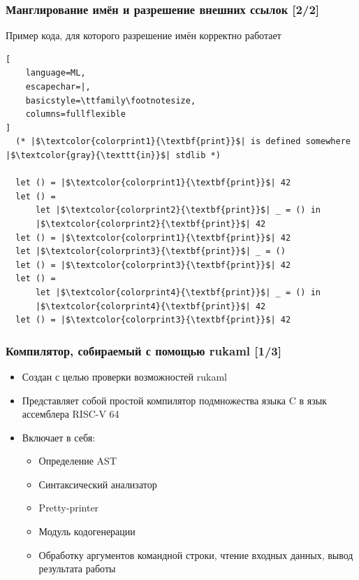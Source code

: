 \documentclass
  [ russian
  , aspectratio=43
  ] {beamer}
\begin{document}
\begin{frame}[fragile]
    \frametitle{\fontsize{13pt}{15.6pt}\selectfont Манглирование имён и разрешение внешних ссылок [2/2]}
    Пример кода, для которого разрешение имён корректно работает

    \begin{lstlisting}[
    language=ML,
    escapechar=|,
    basicstyle=\ttfamily\footnotesize,
    columns=fullflexible
]
  (* |$\textcolor{colorprint1}{\textbf{print}}$| is defined somewhere |$\textcolor{gray}{\texttt{in}}$| stdlib *)

  let () = |$\textcolor{colorprint1}{\textbf{print}}$| 42
  let () =
      let |$\textcolor{colorprint2}{\textbf{print}}$| _ = () in
      |$\textcolor{colorprint2}{\textbf{print}}$| 42
  let () = |$\textcolor{colorprint1}{\textbf{print}}$| 42
  let |$\textcolor{colorprint3}{\textbf{print}}$| _ = ()
  let () = |$\textcolor{colorprint3}{\textbf{print}}$| 42
  let () =
      let |$\textcolor{colorprint4}{\textbf{print}}$| _ = () in
      |$\textcolor{colorprint4}{\textbf{print}}$| 42
  let () = |$\textcolor{colorprint3}{\textbf{print}}$| 42
\end{lstlisting}
\end{frame}


\begin{frame}[fragile]
    \frametitle{Компилятор, собираемый с помощью rukaml [1/3]}
    \begin{itemize}
        \item Создан с целью проверки возможностей rukaml
        \item Представляет собой простой компилятор подмножества языка C в язык ассемблера RISC-V 64
        \item Включает в себя:
              \begin{itemize}
                  \item Определение AST
                  \item Синтаксический анализатор
                  \item Pretty-printer
                  \item Модуль кодогенерации
                  \item Обработку аргументов командной строки, чтение входных данных, вывод результата работы
              \end{itemize}
    \end{itemize}
\end{frame}
\end{document}
